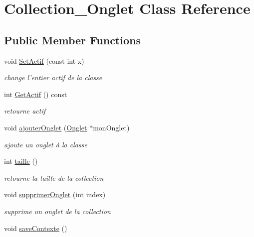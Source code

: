 \hypertarget{classCollection__Onglet}{
\section{Collection\_\-Onglet Class Reference}
\label{classCollection__Onglet}
}
\subsection*{Public Member Functions}
\begin{DoxyCompactItemize}
\item 
void \hyperlink{classCollection__Onglet_a56c620f3b31a3d6a0b3b20a9fa456739}{SetActif} (const int x)
\begin{DoxyCompactList}\small\item\em change l'entier actif de la classe \item\end{DoxyCompactList}\item 
\hypertarget{classCollection__Onglet_af6ee9683baa41fb0f06dd08fa0f379b6}{
int \hyperlink{classCollection__Onglet_af6ee9683baa41fb0f06dd08fa0f379b6}{GetActif} () const }
\label{classCollection__Onglet_af6ee9683baa41fb0f06dd08fa0f379b6}

\begin{DoxyCompactList}\small\item\em retourne actif \item\end{DoxyCompactList}\item 
void \hyperlink{classCollection__Onglet_a5abc570f57bbc5786de4bd2db933b059}{ajouterOnglet} (\hyperlink{classOnglet}{Onglet} $\ast$monOnglet)
\begin{DoxyCompactList}\small\item\em ajoute un onglet à la classe \item\end{DoxyCompactList}\item 
\hypertarget{classCollection__Onglet_a1a596730209916c34d6952f2bf2eaa62}{
int \hyperlink{classCollection__Onglet_a1a596730209916c34d6952f2bf2eaa62}{taille} ()}
\label{classCollection__Onglet_a1a596730209916c34d6952f2bf2eaa62}

\begin{DoxyCompactList}\small\item\em retourne la taille de la collection \item\end{DoxyCompactList}\item 
void \hyperlink{classCollection__Onglet_aa3cc4c74f4a47cd04f3dfa5d46c8a322}{supprimerOnglet} (int index)
\begin{DoxyCompactList}\small\item\em supprime un onglet de la collection \item\end{DoxyCompactList}\item 
\hypertarget{classCollection__Onglet_ac25f27894457f23d19b21c2c83f8c634}{
void \hyperlink{classCollection__Onglet_ac25f27894457f23d19b21c2c83f8c634}{saveContexte} ()}
\label{classCollection__Onglet_ac25f27894457f23d19b21c2c83f8c634}


\end{DoxyCompactItemize}
